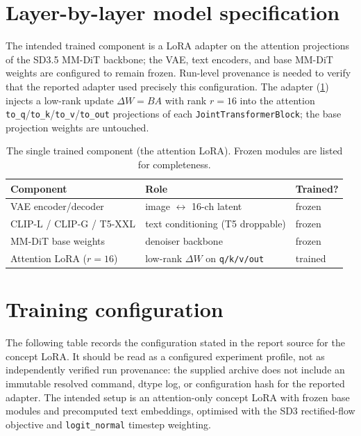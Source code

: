 \documentclass[11pt,a4paper]{article}
\begin{document}
\appendix
\section{Layer-by-layer model specification}\label{app:arch}
The intended trained component is a LoRA adapter on the attention projections
of the SD3.5 MM-DiT backbone; the VAE, text encoders, and base MM-DiT weights
are configured to remain frozen. Run-level provenance is needed to verify that the
reported adapter used precisely this configuration. The adapter (\cref{tab:arch})
injects a low-rank update $\Delta W = BA$ with rank $r=16$ into the attention
\texttt{to\_q}/\texttt{to\_k}/\texttt{to\_v}/\texttt{to\_out} projections of each
\texttt{JointTransformerBlock}; the base projection weights are untouched.

\begin{table}[h]
  \centering
  \caption[Trained-component specification]{The single trained component (the
  attention LoRA). Frozen modules are listed for completeness.}
  \label{tab:arch}
  \begin{tabular}{@{}lll@{}}
    \toprule
    Component & Role & Trained? \\
    \midrule
    VAE encoder/decoder        & image $\leftrightarrow$ 16-ch latent & frozen \\
    CLIP-L / CLIP-G / T5-XXL    & text conditioning (T5 droppable)     & frozen \\
    MM-DiT base weights         & denoiser backbone                    & frozen \\
    Attention LoRA ($r{=}16$)   & low-rank $\Delta W$ on \texttt{q/k/v/out} & trained \\
    \bottomrule
  \end{tabular}
\end{table}

\section{Training configuration}\label{app:train}
The following table records the configuration stated in the report source for
the concept LoRA. It should be read as a configured experiment profile, not
as independently verified run provenance: the supplied archive does not include an
immutable resolved command, dtype log, or configuration hash for the reported
adapter. The intended setup is an attention-only concept LoRA with frozen base
modules and precomputed text embeddings, optimised with the SD3 rectified-flow
objective and \texttt{logit\_normal} timestep weighting.
\end{document}
